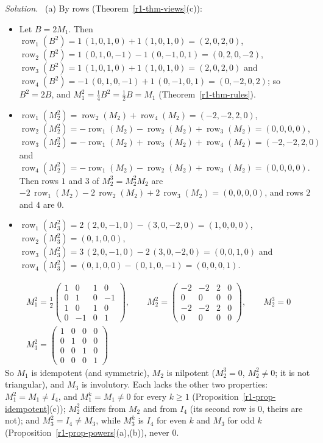 \documentclass[12pt]{article}
\DeclareMathOperator{\row}{row}
\theoremstyle{definition}
\newenvironment{solution}{\par\noindent\textit{Solution.}\ }{\par\smallskip}
\begin{document}
\begin{solution}
(a) By rows (Theorem~\ref{r1-thm-views}(c)):
\begin{itemize}
\item Let \(B=2M_1\). Then \(\row_1(B^2)=1\,(1,0,1,0)+1\,(1,0,1,0)=(2,0,2,0)\),
\(\row_2(B^2)=1\,(0,1,0,-1)-1\,(0,-1,0,1)=(0,2,0,-2)\), \(\row_3(B^2)=1\,(1,0,1,0)+1\,(1,0,1,0)=(2,0,2,0)\) and
\(\row_4(B^2)=-1\,(0,1,0,-1)+1\,(0,-1,0,1)=(0,-2,0,2)\); so \(B^2=2B\), and \(M_1^2=\frac14B^2=\frac12B=M_1\)
(Theorem~\ref{r1-thm-rules}).
\item \(\row_1(M_2^2)=\row_2(M_2)+\row_4(M_2)=(-2,-2,2,0)\),
\(\row_2(M_2^2)=-\row_1(M_2)-\row_2(M_2)+\row_3(M_2)=(0,0,0,0)\),
\(\row_3(M_2^2)=-\row_1(M_2)+\row_3(M_2)+\row_4(M_2)=(-2,-2,2,0)\) and
\(\row_4(M_2^2)=-\row_1(M_2)-\row_2(M_2)+\row_3(M_2)=(0,0,0,0)\). Then rows \(1\) and \(3\) of \(M_2^3=M_2^2M_2\)
are \(-2\,\row_1(M_2)-2\,\row_2(M_2)+2\,\row_3(M_2)=(0,0,0,0)\), and rows \(2\) and \(4\) are \(0\).
\item \(\row_1(M_3^2)=2\,(2,0,-1,0)-(3,0,-2,0)=(1,0,0,0)\), \(\row_2(M_3^2)=(0,1,0,0)\),
\(\row_3(M_3^2)=3\,(2,0,-1,0)-2\,(3,0,-2,0)=(0,0,1,0)\) and \(\row_4(M_3^2)=(0,1,0,0)-(0,1,0,-1)=(0,0,0,1)\).
\end{itemize}
\[
\begin{gathered}
M_1^2=\frac12\begin{pmatrix}1&0&1&0\\0&1&0&-1\\1&0&1&0\\0&-1&0&1\end{pmatrix},\qquad
M_2^2=\begin{pmatrix}-2&-2&2&0\\0&0&0&0\\-2&-2&2&0\\0&0&0&0\end{pmatrix},\qquad M_2^3=0\\
M_3^2=\begin{pmatrix}1&0&0&0\\0&1&0&0\\0&0&1&0\\0&0&0&1\end{pmatrix}
\end{gathered}
\]
So \(M_1\) is idempotent (and symmetric), \(M_2\) is nilpotent (\(M_2^3=0\), \(M_2^2\ne0\); it is not
triangular), and \(M_3\) is involutory. Each lacks the other two properties: \(M_1^2=M_1\ne I_4\), and
\(M_1^k=M_1\ne0\) for every \(k\geqslant1\) (Proposition~\ref{r1-prop-idempotent}(c)); \(M_2^2\) differs from \(M_2\)
and from \(I_4\) (its second row is \(0\), theirs are not); and \(M_3^2=I_4\ne M_3\), while \(M_3^k\) is \(I_4\) for
even \(k\) and \(M_3\) for odd \(k\) (Proposition~\ref{r1-prop-powers}(a),(b)), never \(0\).


\end{solution}
\end{document}
